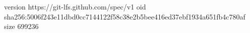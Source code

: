 version https://git-lfs.github.com/spec/v1
oid sha256:5006f243e11dbd0cc7144122f58c38e2b5bee416ed37ebf1934a651fb4c780af
size 699236

